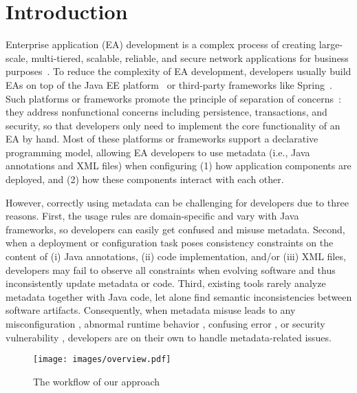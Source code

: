 \section{Introduction}
Enterprise application (EA) development is a complex process of creating large-scale, multi-tiered, scalable, reliable, and secure network applications for business purposes~\cite{ea-development}. 
To reduce the complexity of EA development, developers usually build EAs on top of the Java EE platform~\cite{javaEE} or third-party frameworks like Spring~\cite{spring}. Such platforms or frameworks promote the principle of separation of concerns~\cite{Hursch95separationof}: 
they address nonfunctional concerns including persistence, transactions, and security, so that 
 developers only need to implement the core functionality of an EA by hand. 
Most of these platforms or frameworks support a declarative programming model, allowing EA developers to use metadata (i.e., Java annotations and XML files) when configuring (1) how application components are deployed, and (2) how these components interact with each other.

However, correctly using metadata can be challenging for developers due to three reasons. First, the usage rules are domain-specific and vary with Java frameworks, so developers can easily get confused and misuse metadata. Second, when a deployment or configuration task poses consistency constraints on the content of (i) Java annotations, (ii) code implementation, and/or (iii) XML files, developers may fail to observe all constraints when evolving software and thus inconsistently update metadata or code. Third, existing tools \cite{chamberlin2002xquery,Song12,Wen20} rarely analyze metadata together with Java code, let alone find semantic inconsistencies between software artifacts. Consequently, when metadata misuse leads to any misconfiguration \cite{misconfiguration}, abnormal runtime behavior \cite{springSecurity}, confusing error \cite{confuse_error}, or security vulnerability \cite{security-vul}, developers are on their own to handle metadata-related issues.


\begin{figure}
\centering
\texttt{[image: images/overview.pdf]}
\vspace{-1.5em}
\caption{The workflow of our approach}\label{fig:overview}
\vspace{-2.em}
\end{figure}

